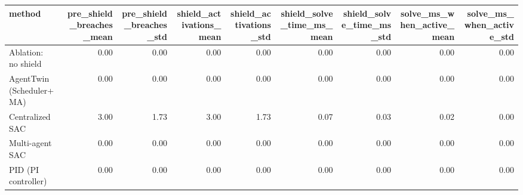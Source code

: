 \begin{tabular}{lrrrrrrrr}
\toprule
method & pre_shield_breaches_mean & pre_shield_breaches_std & shield_activations_mean & shield_activations_std & shield_solve_time_ms_mean & shield_solve_time_ms_std & solve_ms_when_active_mean & solve_ms_when_active_std \\
\midrule
Ablation: no shield & 0.00 & 0.00 & 0.00 & 0.00 & 0.00 & 0.00 & 0.00 & 0.00 \\
AgentTwin (Scheduler+MA) & 0.00 & 0.00 & 0.00 & 0.00 & 0.00 & 0.00 & 0.00 & 0.00 \\
Centralized SAC & 3.00 & 1.73 & 3.00 & 1.73 & 0.07 & 0.03 & 0.02 & 0.00 \\
Multi-agent SAC & 0.00 & 0.00 & 0.00 & 0.00 & 0.00 & 0.00 & 0.00 & 0.00 \\
PID (PI controller) & 0.00 & 0.00 & 0.00 & 0.00 & 0.00 & 0.00 & 0.00 & 0.00 \\
\bottomrule
\end{tabular}

